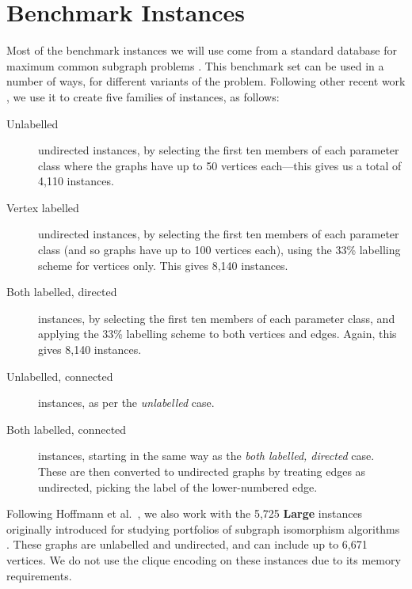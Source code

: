 \documentclass{llncs}
\begin{document}
\section{Benchmark Instances}

Most of the benchmark instances we will use come from a standard database for maximum common
subgraph problems \cite{DBLP:journals/prl/SantoFSV03,DBLP:journals/jgaa/ConteFV07}. This benchmark
set can be used in a number of ways, for different variants of the problem. Following other recent
work \cite{DBLP:conf/cp/McCreeshNPS16,DBLP:conf/aaai/HoffmannMR17,o:McCreeshPT17}, we use it to
create five families of instances, as follows:

\begin{description}
    \item[Unlabelled] undirected instances, by selecting the first ten members of each parameter
        class where the graphs have up to 50 vertices each---this gives us a total of 4,110
        instances.

    \item[Vertex labelled] undirected instances, by selecting the first ten members of each
        parameter class (and so graphs have up to 100 vertices each), using the 33\%
        labelling scheme \cite{DBLP:journals/prl/SantoFSV03} for vertices only. This gives 8,140 instances.

    \item[Both labelled, directed] instances, by selecting the first ten members of each parameter
        class, and applying the 33\% labelling scheme \cite{DBLP:journals/prl/SantoFSV03} to both
        vertices and edges. Again, this gives 8,140 instances.

    \item[Unlabelled, connected] instances, as per the \emph{unlabelled} case.

    \item[Both labelled, connected] instances, starting in the same way as the \emph{both labelled,
        directed} case. These are then converted to undirected graphs by treating edges as
        undirected, picking the label of the lower-numbered edge.
\end{description}

\noindent
Following Hoffmann et al.\ \cite{DBLP:conf/aaai/HoffmannMR17}, we also work with the 5,725 \textbf{Large} instances
originally introduced for studying portfolios of subgraph isomorphism algorithms
\cite{DBLP:conf/lion/KotthoffMS16}. These graphs are unlabelled and undirected, and can include up
to 6,671 vertices. We do not use the clique encoding on these instances due to its
memory requirements.
\end{document}
